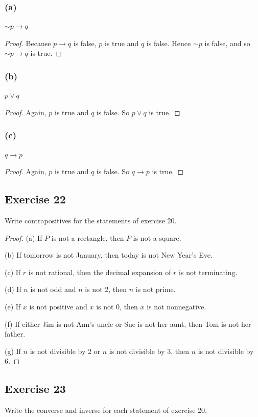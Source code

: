 \documentclass[14pt]{extarticle}
\begin{document}
\subsubsection{(a)}
${\sim p} \to q$

\begin{proof}
Because $p \to q$ is false, $p$ is true and $q$ is false. Hence ${\sim p}$ is
false, and so ${\sim p} \to q$ is true.
\end{proof}

\subsubsection{(b)}
$p \vee q$

\begin{proof}
Again, $p$ is true and $q$ is false. So $p \vee q$ is true.
\end{proof}

\subsubsection{(c)}
$q \to p$

\begin{proof}
Again, $p$ is true and $q$ is false. So $q \to p$ is true.
\end{proof}

\subsection{Exercise 22}
Write contrapositives for the statements of exercise 20.

\begin{proof}
(a) If $P$ is not a rectangle, then $P$ is not a square.

(b) If tomorrow is not January, then today is not New Year’s Eve.

(c) If $r$ is not rational, then the decimal expansion of $r$ is not
terminating.

(d) If $n$ is not odd and $n$ is not 2, then $n$ is not prime.

(e) If $x$ is not positive and $x$ is not 0, then $x$ is not nonnegative.

(f) If either Jim is not Ann’s uncle or Sue is not her aunt, then Tom is not her
father.

(g) If $n$ is not divisible by 2 or $n$ is not divisible by 3, then $n$ is not
divisible by 6.
\end{proof}

\subsection{Exercise 23}
Write the converse and inverse for each statement of exercise 20.
\end{document}
